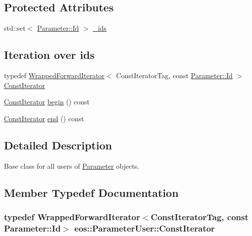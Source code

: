 \subsection*{Protected Attributes}
\begin{DoxyCompactItemize}
\item 
std::set$<$ \hyperlink{classeos_1_1Parameter_a065f55e66b2128cc5f14339e676d833a}{Parameter::Id} $>$ \hyperlink{classeos_1_1ParameterUser_aa3a0285297e16cf2a5830df1f9bb2f4b}{\_\-ids}
\end{DoxyCompactItemize}
\subsection*{Iteration over ids}
\label{_amgrp719dadb6383be95df6deeaf25dd0c545}
 \begin{DoxyCompactItemize}
\item 
typedef \hyperlink{classeos_1_1WrappedForwardIterator}{WrappedForwardIterator}$<$ ConstIteratorTag, const \hyperlink{classeos_1_1Parameter_a065f55e66b2128cc5f14339e676d833a}{Parameter::Id} $>$ \hyperlink{classeos_1_1ParameterUser_a7105631bbcb4b2492e6377b2b69f5b0f}{ConstIterator}
\item 
\hyperlink{classeos_1_1WrappedForwardIterator}{ConstIterator} \hyperlink{classeos_1_1ParameterUser_a9cd569207063cd2a8f807c4e1203a5d4}{begin} () const 
\item 
\hyperlink{classeos_1_1WrappedForwardIterator}{ConstIterator} \hyperlink{classeos_1_1ParameterUser_a5813c886f3fd3f074cc02a53fc9e0790}{end} () const 
\end{DoxyCompactItemize}


\subsection{Detailed Description}
Base class for all users of \hyperlink{classeos_1_1Parameter}{Parameter} objects. 

\subsection{Member Typedef Documentation}
\hypertarget{classeos_1_1ParameterUser_a7105631bbcb4b2492e6377b2b69f5b0f}{
\subsubsection[{ConstIterator}]{\setlength{\rightskip}{0pt plus 5cm}typedef {\bf WrappedForwardIterator}$<$ConstIteratorTag, const {\bf Parameter::Id}$>$ {\bf eos::ParameterUser::ConstIterator}}}
\label{classeos_1_1ParameterUser_a7105631bbcb4b2492e6377b2b69f5b0f}


